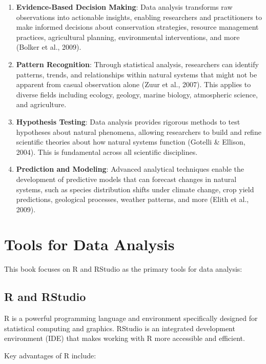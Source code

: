 \documentclass[
  letterpaper,
]{book}
\begin{document}
\begin{enumerate}
\def\labelenumi{\arabic{enumi}.}
\item
  \textbf{Evidence-Based Decision Making}: Data analysis transforms raw
  observations into actionable insights, enabling researchers and
  practitioners to make informed decisions about conservation
  strategies, resource management practices, agricultural planning,
  environmental interventions, and more (Bolker et al., 2009).
\item
  \textbf{Pattern Recognition}: Through statistical analysis,
  researchers can identify patterns, trends, and relationships within
  natural systems that might not be apparent from casual observation
  alone (Zuur et al., 2007). This applies to diverse fields including
  ecology, geology, marine biology, atmospheric science, and
  agriculture.
\item
  \textbf{Hypothesis Testing}: Data analysis provides rigorous methods
  to test hypotheses about natural phenomena, allowing researchers to
  build and refine scientific theories about how natural systems
  function (Gotelli \& Ellison, 2004). This is fundamental across all
  scientific disciplines.
\item
  \textbf{Prediction and Modeling}: Advanced analytical techniques
  enable the development of predictive models that can forecast changes
  in natural systems, such as species distribution shifts under climate
  change, crop yield predictions, geological processes, weather
  patterns, and more (Elith et al., 2009).
\end{enumerate}

\section{Tools for Data Analysis}\label{tools-for-data-analysis}

This book focuses on R and RStudio as the primary tools for data
analysis:

\subsection{R and RStudio}\label{r-and-rstudio}

R is a powerful programming language and environment specifically
designed for statistical computing and graphics. RStudio is an
integrated development environment (IDE) that makes working with R more
accessible and efficient.

Key advantages of R include:
\end{document}
